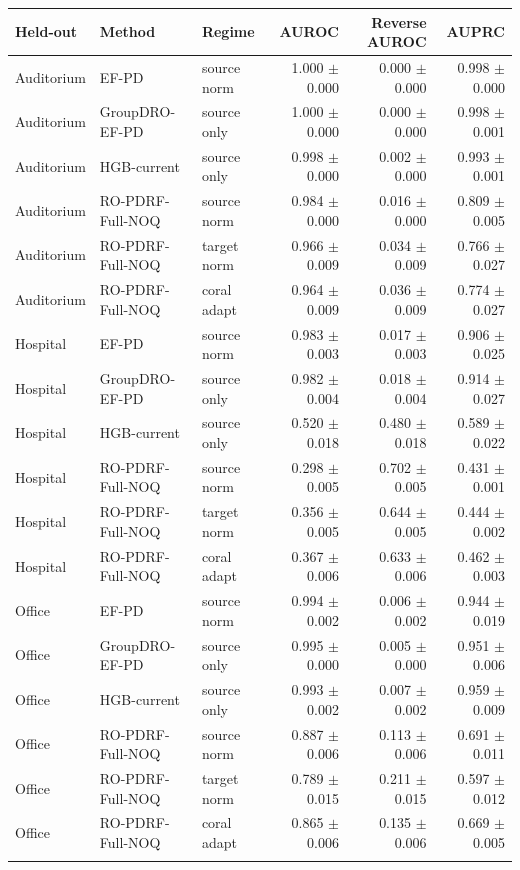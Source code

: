 \begin{tabular}{lllrrr}
\toprule
Held-out & Method & Regime & AUROC & Reverse AUROC & AUPRC \\
\midrule
Auditorium & EF-PD & source norm & 1.000 $\pm$ 0.000 & 0.000 $\pm$ 0.000 & 0.998 $\pm$ 0.000 \\
Auditorium & GroupDRO-EF-PD & source only & 1.000 $\pm$ 0.000 & 0.000 $\pm$ 0.000 & 0.998 $\pm$ 0.001 \\
Auditorium & HGB-current & source only & 0.998 $\pm$ 0.000 & 0.002 $\pm$ 0.000 & 0.993 $\pm$ 0.001 \\
Auditorium & RO-PDRF-Full-NOQ & source norm & 0.984 $\pm$ 0.000 & 0.016 $\pm$ 0.000 & 0.809 $\pm$ 0.005 \\
Auditorium & RO-PDRF-Full-NOQ & target norm & 0.966 $\pm$ 0.009 & 0.034 $\pm$ 0.009 & 0.766 $\pm$ 0.027 \\
Auditorium & RO-PDRF-Full-NOQ & coral adapt & 0.964 $\pm$ 0.009 & 0.036 $\pm$ 0.009 & 0.774 $\pm$ 0.027 \\
\addlinespace
Hospital & EF-PD & source norm & 0.983 $\pm$ 0.003 & 0.017 $\pm$ 0.003 & 0.906 $\pm$ 0.025 \\
Hospital & GroupDRO-EF-PD & source only & 0.982 $\pm$ 0.004 & 0.018 $\pm$ 0.004 & 0.914 $\pm$ 0.027 \\
Hospital & HGB-current & source only & 0.520 $\pm$ 0.018 & 0.480 $\pm$ 0.018 & 0.589 $\pm$ 0.022 \\
Hospital & RO-PDRF-Full-NOQ & source norm & 0.298 $\pm$ 0.005 & 0.702 $\pm$ 0.005 & 0.431 $\pm$ 0.001 \\
Hospital & RO-PDRF-Full-NOQ & target norm & 0.356 $\pm$ 0.005 & 0.644 $\pm$ 0.005 & 0.444 $\pm$ 0.002 \\
Hospital & RO-PDRF-Full-NOQ & coral adapt & 0.367 $\pm$ 0.006 & 0.633 $\pm$ 0.006 & 0.462 $\pm$ 0.003 \\
\addlinespace
Office & EF-PD & source norm & 0.994 $\pm$ 0.002 & 0.006 $\pm$ 0.002 & 0.944 $\pm$ 0.019 \\
Office & GroupDRO-EF-PD & source only & 0.995 $\pm$ 0.000 & 0.005 $\pm$ 0.000 & 0.951 $\pm$ 0.006 \\
Office & HGB-current & source only & 0.993 $\pm$ 0.002 & 0.007 $\pm$ 0.002 & 0.959 $\pm$ 0.009 \\
Office & RO-PDRF-Full-NOQ & source norm & 0.887 $\pm$ 0.006 & 0.113 $\pm$ 0.006 & 0.691 $\pm$ 0.011 \\
Office & RO-PDRF-Full-NOQ & target norm & 0.789 $\pm$ 0.015 & 0.211 $\pm$ 0.015 & 0.597 $\pm$ 0.012 \\
Office & RO-PDRF-Full-NOQ & coral adapt & 0.865 $\pm$ 0.006 & 0.135 $\pm$ 0.006 & 0.669 $\pm$ 0.005 \\
\addlinespace
\bottomrule
\end{tabular}